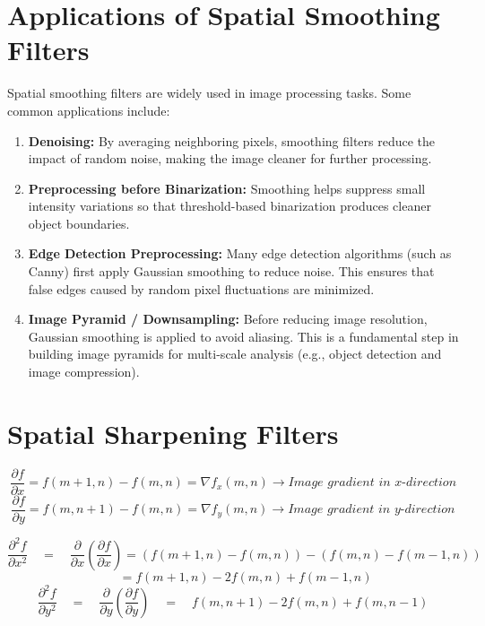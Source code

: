\documentclass[12 pt]{article}        	%
\begin{document}
\section{Applications of Spatial Smoothing Filters}
Spatial smoothing filters are widely used in image processing tasks. 
Some common applications include:
\begin{enumerate}
    \item \textbf{Denoising:} 
    By averaging neighboring pixels, smoothing filters reduce the impact 
    of random noise, making the image cleaner for further processing.

    \item \textbf{Preprocessing before Binarization:} 
    Smoothing helps suppress small intensity variations so that threshold-based 
    binarization produces cleaner object boundaries.

    \item \textbf{Edge Detection Preprocessing:} 
    Many edge detection algorithms (such as Canny) first apply Gaussian smoothing 
    to reduce noise. This ensures that false edges caused by random pixel fluctuations 
    are minimized.

    \item \textbf{Image Pyramid / Downsampling:} 
    Before reducing image resolution, Gaussian smoothing is applied to avoid aliasing. 
    This is a fundamental step in building image pyramids for multi-scale analysis 
    (e.g., object detection and image compression).
\end{enumerate}

\section{Spatial Sharpening Filters}
\[
\frac{\partial f}{\partial x} = f(m+1,n) - f(m,n) = \nabla f_x(m,n) \rightarrow \textit{Image gradient in x-direction}
\]
\[
\frac{\partial f}{\partial y} = f(m,n+1) - f(m,n)=\nabla f_y(m,n) \rightarrow \textit{Image gradient in y-direction}
\]

\[
\frac{\partial^2 f}{\partial x^2} 
\quad=\quad \frac{\partial}{\partial x}\!\left(\frac{\partial f}{\partial x}\right) 
= (f(m+1,n) - f(m,n)) - (f(m,n) - f(m-1,n)) 
\]
\[
\quad\quad= f(m+1,n) - 2f(m,n) + f(m-1,n)
\]
\[
\frac{\partial^2 f}{\partial y^2} 
\quad=\quad \frac{\partial}{\partial y}\!\left(\frac{\partial f}{\partial y}\right) 
\quad=\quad  f(m,n+1) - 2f(m,n) + f(m,n-1)
\]
\end{document}
